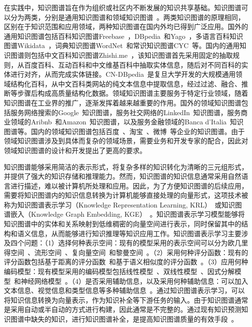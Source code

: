 \documentclass[algorithmlist, AutoFakeBold, AutoFakeSlant, figurelist, tablelist, nomlist, masters]{seuthesix}
\begin{document}
在实践中，知识图谱旨在作为组织或社区内不断发展的知识共享基础。知识图谱可以分为两类，分别是通用知识图谱和领域知识图谱~\cite{hogan2021knowledge}。两类知识图谱的原理相同，区别在于知识范围和应用领域，两种知识图谱在国内外均已得到广泛应用。国外的通用知识图谱包括百科知识图谱Freebase~\cite{bollacker2007platform}，DBpedia~\cite{lehmann2015dbpedia}和Yago~\cite{hoffart2011yago2}，多语言百科知识图谱Wikidata~\cite{vrandevcic2014wikidata}，词典知识图谱WordNet~\cite{miller2007wordnet}和常识知识图谱CYC~\cite{lenat1995cyc}等。国内的通用知识图谱则包括中文百科知识图谱Zhishi.me~\cite{niu2011zhishi}，该知识图谱首先采用固定的抽取规则，从百度百科、互动百科和中文维基百科中抽取实体信息，随后对不同百科的实体进行对齐，从而完成实体链接。CN-DBpedia~\cite{xu2017cn}是复旦大学开发的大规模通用领域结构化百科，从中文百科类网站的纯文本信息中提取信息，经过过滤、融合、推断等步骤后构成高质量结构化数据。领域知识图谱主要服务于特定行业领域，随着知识图谱在工业界的推广，逐渐发挥着越来越重要的作用。国外的领域知识图谱包括服务网络搜索的Google~\cite{singhal_2012}知识图谱，服务社交网络的LinkedIn~\cite{Qi_2016}知识图谱，服务商业领域的Aribnb~\cite{Spencer_2018}和Amazon~\cite{Krishnan_2018}知识图谱，以及服务金融领域的Banca d’Italia~\cite{bellomarini2019knowledge}知识图谱等。国内的领域知识图谱包括百度~\cite{wang2013xlore}、淘宝~\cite{xu2021alime}、微博~\cite{wei2020analysis}等企业的知识图谱。由于领域知识图谱涉及到具体而复杂的领域场景，需要业务和开发专家的配合，因此对领域知识图谱的设计和开发提出了更高的要求。

知识图谱能够采用简洁的表示形式，将复杂多样的知识转化为清晰的三元组形式，并提供了强大的知识存储和推理能力。然而，知识图谱的知识信息通常采用自然语言进行描述，难以被计算机所处理和应用。因此，为了方便知识图谱的后续应用，需要将知识图谱内的知识信息转换为计算机能够直接处理的向量形式，这项技术被称为知识图谱表示学习（Knowledge Representation Learning, KRL）~\cite{chen2022rlpath}或知识图谱嵌入（Knowledge Graph Embedding, KGE）~\cite{wang2021transet}。知识图谱表示学习模型能够将知识图谱中的实体和关系映射到低维稠密的向量空间进行表示，同时保留其中的结构和语义信息，从而能够进行知识推理等知识应用工作。知识图谱表示学习主要涉及四个问题：（1）选择何种表示空间：现有的模型采用的表示空间可以分为欧几里得空间~\cite{lu2022dense}、流形空间~\cite{ebisu2018toruse}、复向量空间~\cite{trouillon2016complex}和黎曼空间~\cite{pan2021hyperbolic}。（2）采用何种评分函数：现有的评分函数包括基于距离的评分函数~\cite{sachan2020knowledge}和基于语义相似度的评分函数~\cite{xiao2017ssp}。（3）应用何种编码模型：现有模型采用的编码模型包括线性模型~\cite{peng2020lineare}、双线性模型~\cite{pan2021hyperbolic}、因式分解模型~\cite{ji2015knowledge}和神经网络模型~\cite{jiang2021kernel}。（4）是否采用辅助信息，以及采用何种辅助信息：可以加入文本信息、视觉信息和类型信息等多种辅助信息~\cite{wang2017knowledge}。通过知识图谱表示学习，可以将知识信息转换为向量表示，作为知识补全等下游任务的输入。由于知识图谱通常是采用自动或半自动的方式进行构建，因此通常是不完整的。通过现有知识预测知识图谱中缺失的知识，进行知识图谱补全，是提高知识图谱质量的有效手段~\cite{vu2019capsule}。
\end{document}
